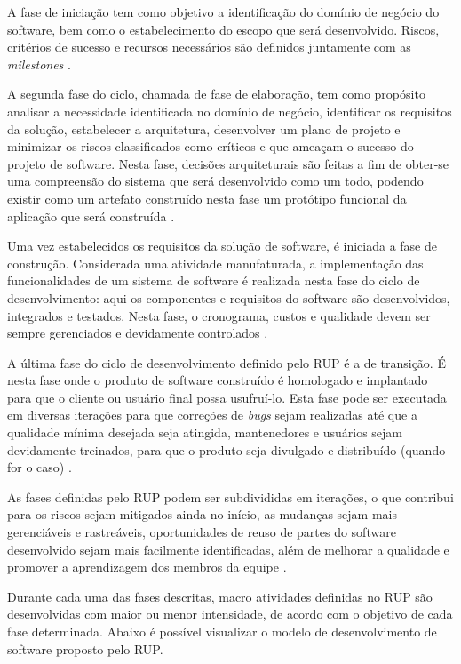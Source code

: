 A fase de iniciação tem como objetivo a identificação do domínio de negócio do software, bem como o estabelecimento do escopo que será desenvolvido. Riscos, critérios de sucesso e recursos necessários são definidos juntamente com as \textit{milestones} \cite{rational_software_rational_1998}.

A segunda fase do ciclo, chamada de fase de elaboração, tem como propósito analisar a necessidade identificada no domínio de negócio, identificar os requisitos da solução, estabelecer a arquitetura, desenvolver um plano de projeto e minimizar os riscos classificados como críticos e que ameaçam o sucesso do projeto de software. Nesta fase, decisões arquiteturais são feitas a fim de obter-se uma compreensão do sistema que será desenvolvido como um todo, podendo existir como um artefato construído nesta fase um protótipo funcional da aplicação que será construída \cite{rational_software_rational_1998}.

Uma vez estabelecidos os requisitos da solução de software, é iniciada a fase de construção. Considerada uma atividade manufaturada, a implementação das funcionalidades de um sistema de software é realizada nesta fase do ciclo de desenvolvimento: aqui os componentes e requisitos do software são desenvolvidos, integrados e testados. Nesta fase, o cronograma, custos e qualidade devem ser sempre gerenciados e devidamente controlados \cite{rational_software_rational_1998}.

A última fase do ciclo de desenvolvimento definido pelo RUP é a de transição. É nesta fase onde o produto de software construído é homologado e implantado para que o cliente ou usuário final possa usufruí-lo. Esta fase pode ser executada em diversas iterações para que correções de \textit{bugs} sejam realizadas até que a qualidade mínima desejada seja atingida, mantenedores e usuários sejam devidamente treinados, para que o produto seja divulgado e distribuído (quando for o caso) \cite{rational_software_rational_1998}.

As fases definidas pelo RUP podem ser subdivididas em iterações, o que contribui para os riscos sejam mitigados ainda no início, as mudanças sejam mais gerenciáveis e rastreáveis, oportunidades de reuso de partes do software desenvolvido sejam mais facilmente identificadas, além de melhorar a qualidade e promover a aprendizagem dos membros da equipe \cite{rational_software_rational_1998}.

Durante cada uma das fases descritas, macro atividades definidas no RUP são desenvolvidas com maior ou menor intensidade, de acordo com o objetivo de cada fase determinada. Abaixo é possível visualizar o modelo de desenvolvimento de software proposto pelo RUP.


